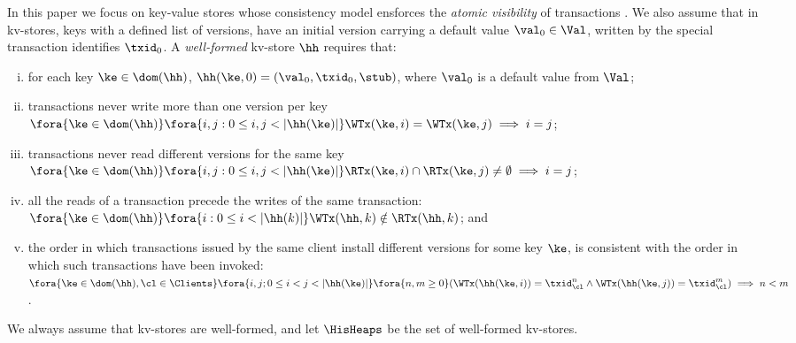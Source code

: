 In this paper we focus on key-value stores whose consistency model ensforces the  
\emph{atomic visibility} of transactions \cite{framework-concur}. 
We also assume that in kv-stores, keys with a defined list of versions, have an initial version carrying  a default value $\val_0 \in \Val$, 
written by the special transaction identifies $\txid_0$.
A \emph{well-formed} kv-store $\hh$ requires that:
\begin{enumerate}[(i)]
\item for each key $\ke \in \dom(\hh)$, $\hh(\ke, 0) = (\val_0, \txid_0, \stub)$, where $\val_0$ is a default value from $\Val$;
\item transactions never write more than one version per key $\fora{\ke \in \dom(\hh)} \fora{ i,j : 0 \leq i, j < \lvert \hh(\ke) \rvert}
\WTx(\ke, i) = \WTx(\ke, j) \implies i = j$;
\item transactions never read different versions 
for the same key $\fora{ \ke \in \dom(\hh)} \fora{ i,j : 0 \leq i, j < \lvert \hh(\ke) \rvert}
\RTx(\ke, i) \cap \RTx(\ke, j) \neq \emptyset \implies i = j$;
\item all the reads of a transaction precede the writes of the same transaction: $\fora{ \ke \in \dom(\hh)}
\fora{ i : 0 \leq i < \lvert \hh(k) \rvert} \WTx(\hh, k) \notin \RTx(\hh,k)$; and
\item the order 
in which transactions issued by the same client install different versions for some key $\ke$, is consistent with the order in which 
such transactions have been invoked: $\fora{ \ke \in \dom(\hh), \cl \in \Clients} \fora{ i,j; 0 \leq i < j < \lvert \hh(\ke) \rvert}
\fora{ n, m \geq 0} (\WTx(\hh(\ke,i)) = \txid_{\cl}^{n} \wedge \WTx(\hh(\ke,j)) = \txid_{\cl}^{m}) \implies n < m$.
\end{enumerate}
We always assume that kv-stores are well-formed, and let $\HisHeaps$ be the set of well-formed kv-stores.

